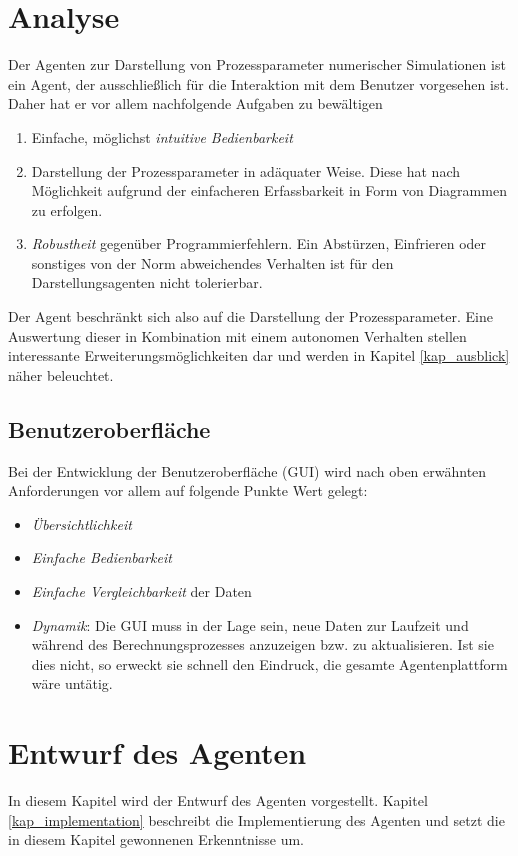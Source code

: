 \documentclass[a4paper,12pt,oneside,openright,onecolumn,final,titlepage,fleqn,ngerman]{scrreprt}
\newcommand{\repag}{Darstellungsagent}
\begin{document}
	\chapter{Analyse}\label{kap_analyse}
	Der Agenten zur Darstellung von Prozessparameter numerischer Simulationen ist ein Agent, der ausschließlich für die Interaktion mit dem Benutzer vorgesehen ist. Daher hat er vor allem nachfolgende Aufgaben zu bewältigen
	
	\begin{enumerate}[\protect{A}1: ]
		\item Einfache, möglichst  \emph{intuitive Bedienbarkeit}
		\item Darstellung der Prozessparameter in adäquater Weise. Diese hat nach Mög\-lich\-keit aufgrund der einfacheren Erfassbarkeit in Form von Diagrammen zu erfolgen.
		\item \emph{Robustheit} gegenüber Programmierfehlern. Ein Abstürzen, Einfrieren oder sonstiges von der Norm abweichendes Verhalten ist für den \repag{}en nicht tolerierbar.
	\end{enumerate}
	
	Der Agent beschränkt sich also auf die Darstellung der Prozessparameter. Eine Auswertung dieser in Kombination mit einem autonomen Verhalten stellen interessante Erweiterungsmöglichkeiten dar und werden in Kapitel \ref{kap_ausblick} näher beleuchtet.
	
	\section{Benutzeroberfläche}\label{kap_ana_gui}
	Bei der Entwicklung der Benutzeroberfläche (GUI) wird nach oben erwähnten Anforderungen vor allem auf folgende Punkte Wert gelegt:
	\begin{itemize}
		\item \emph{Übersichtlichkeit}
		\item \emph{Einfache Bedienbarkeit}
		\item \emph{Einfache Vergleichbarkeit} der Daten
		\item \emph{Dynamik}: Die GUI muss in der Lage sein, neue Daten zur Laufzeit und während des Berechnungsprozesses anzuzeigen bzw. zu aktualisieren. Ist sie dies nicht, so erweckt sie schnell den Eindruck, die gesamte Agentenplattform wäre untätig.
	\end{itemize}
	
	\chapter{Entwurf des Agenten}\label{kap_entwurf}
	In diesem Kapitel wird der Entwurf des Agenten vorgestellt. Kapitel \ref{kap_implementation} beschreibt die Implementierung des Agenten und setzt die in diesem Kapitel gewonnenen Erkenntnisse um.
	
\end{document}
